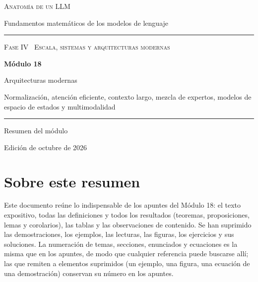 \documentclass[11pt,a4paper,twoside,openany]{book}
\begin{document}
\frontmatter
\begin{titlepage}
\centering
\vspace*{2.5cm}
{\large\scshape Anatomía de un LLM}\par
\vspace{0.4cm}
{\normalsize Fundamentos matemáticos de los modelos de lenguaje}\par
\vspace{2.2cm}
\rule{\textwidth}{0.8pt}\par\vspace{0.5cm}
{\small\scshape Fase IV \textperiodcentered\ Escala, sistemas y arquitecturas modernas}\par\vspace{0.3cm}
{\Huge\bfseries Módulo 18\par}\vspace{0.3cm}
{\LARGE Arquitecturas modernas\par}
\vspace{0.2cm}
{\large Normalización, atención eficiente, contexto largo, mezcla de expertos, modelos de espacio de estados y multimodalidad\par}
\vspace{0.5cm}\rule{\textwidth}{0.4pt}\par
\vspace{1.6cm}
{\large Resumen del módulo}\par
\vfill
{\small Edición de octubre de 2026}\par
\end{titlepage}

\chapter*{Sobre este resumen}

Este documento reúne lo indispensable de los apuntes del Módulo 18: el texto expositivo, todas las definiciones y todos los resultados (teoremas, proposiciones, lemas y corolarios), las tablas y las observaciones de contenido. Se han suprimido las demostraciones, los ejemplos, las lecturas, las figuras, los ejercicios y sus soluciones. La numeración de temas, secciones, enunciados y ecuaciones es la misma que en los apuntes, de modo que cualquier referencia puede buscarse allí; las que remiten a elementos suprimidos (un ejemplo, una figura, una ecuación de una demostración) conservan su número en los apuntes.
\end{document}
